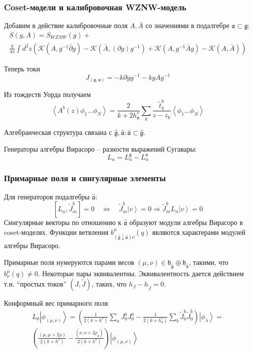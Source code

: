 \documentclass[pdftex]{beamer}
\newcommand{\gf}{\mathfrak{g}}
\newcommand{\gfh}{\hat{\mathfrak{g}}}
\newcommand{\af}{\mathfrak{a}}
\newcommand{\afh}{\hat{\mathfrak{a}}}
\newcommand{\hf}{\mathfrak{h}}
\theoremstyle{definition} \newtheorem{Def}{Определение}
\begin{document}
\begin{frame}
  \frametitle{Coset-модели и калибровочная WZNW-модель}

  Добавим в действие калибровочные поля $A, \bar{A}$ со значениями в подалгебре $\af\subset \gf$:
  \begin{multline*}
    S(g,A)=S_{WZNW}(g)+\\
    \frac{k}{4\pi}\int d^{2}z \left(\mathcal{K}(A, g^{-1}\bar \partial g)-\mathcal{K}(\bar A, (\partial g ) g^{-1})+\mathcal{K}(A,g^{-1}\bar A g)-\mathcal{K}(A,\bar A)\right)
  \end{multline*}

  Теперь токи
  \begin{equation*}
    J_{(\gf,\af)}=-k\partial g g^{-1} -k g A g^{-1}
  \end{equation*}

  Из тождеств Уорда получаем
  \begin{equation*}
    \left< A^{b}(z)\phi_{1}\dots \phi_{N}\right>=\frac{2}{k+2 h^{v}_{\af}}\sum_{k}\frac{\tilde{t}^{b}_{k}}{z-z_{k}}\left<\phi_{1}\dots \phi_{N}\right>
  \end{equation*}


  Алгебраическая структура связана с  $\gfh, \afh: \afh\subset\gfh$. 

  Генераторы алгебры Вирасоро -- разности выражений Сугавары:
  \begin{equation*}
    L_{n}=L_{n}^{\gf}-L_{n}^{\af}
  \end{equation*}
\end{frame}

\begin{frame}
  \frametitle{Примарные поля и сингулярные элементы}
  Для генераторов подалгебры $\afh$:
  \begin{equation*}
    \left[ L_{n}, \tilde{J}^{b}_{m}\right]=0 \quad\Longleftrightarrow\quad \tilde{J}^{b}_{m}\left| v \right>=0\Rightarrow \tilde{J}^{b}_{m}L_{n}\left| v \right>=0
  \end{equation*}
  Сингулярные векторы по отношению к $\afh$ образуют модули алгебры Вирасоро в coset-моделях. Функции ветвления $b^{\mu}_{(\gfh\downarrow\afh) \nu}(q)$ являются характерами модулей алгебры Вирасоро.

  Примарные поля нумеруются парами весов $(\mu,\nu)\in \hf_{\gfh}\oplus \hf_{\afh}$, такими, что  $b^{\mu}_{\nu}(q)\neq 0$. Некоторые пары эквивалентны. Эквивалентность дается действием т.н. ``простых токов'' $(J,\tilde{J})$, таких, что $h_{J}-h_{\tilde{J}}=0$. 

  Конформный вес примарного поля
  \begin{multline}
    L_0\left|\phi_{(\mu,\nu)}\right>=\left(\frac{1}{2(k+h^v)}\sum_aJ^a_0J^a_0-\frac{1}{2(k+h_{\af}^v)}\sum_b \tilde{J}^b_0 \tilde{J}^b_0 \right)
    \left|\phi_{\lambda}\right>=\\
    \left(\frac{(\mu,\mu+2\rho)}{2(k+h^v)}-\frac{(\nu,\nu+2\rho_{\af})}{2(k+h^v)}\right)\left|\phi_{(\mu,\nu)}\right>
  \end{multline}

\end{frame}
\end{document}
